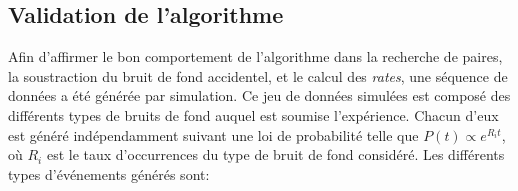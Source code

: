 

%
%


\bigbreak

\subsection{Validation de l'algorithme}

Afin d'affirmer le bon comportement de l'algorithme dans la recherche de paires, la soustraction du bruit de fond accidentel, et le calcul des \textit{rates}, une séquence de données a été générée par simulation. Ce jeu de données simulées est composé des différents types de bruits de fond auquel est soumise l'expérience. Chacun d'eux est généré indépendamment suivant une loi de probabilité telle que $P(t) \propto e^{R_it}$, où $R_i$ est le taux d'occurrences du type de bruit de fond considéré. Les différents types d'événements générés sont:\\

